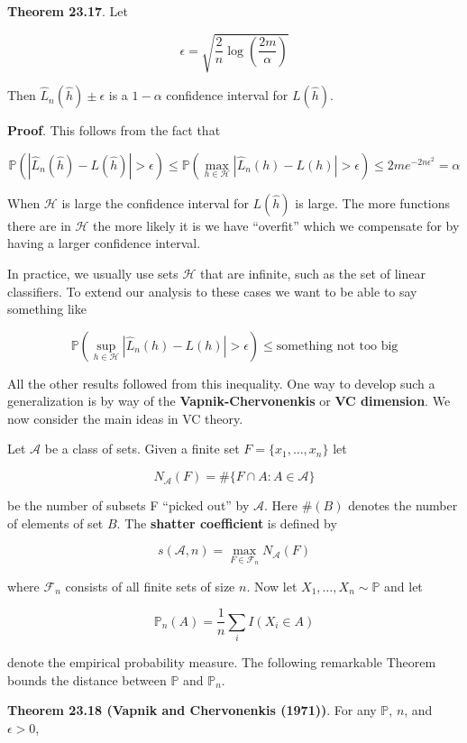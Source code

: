 \textbf{Theorem 23.17}. Let

\[ \epsilon = \sqrt{\frac{2}{n} \log \left( \frac{2m}{\alpha} \right) } \]

Then \(\hat{L}_{n}(\hat{h}) \pm \epsilon\) is a \(1 - \alpha\) confidence
interval for \(L(\hat{h})\).

\textbf{Proof}. This follows from the fact that

\[
\mathbb{P}(|\hat{L}_{n}(\hat{h}) - L(\hat{h})| > \epsilon) 
\leq \mathbb{P}( \max_{h \in \mathcal{H}} |\hat{L}_{n}(h) - L(h) | > \epsilon )
\leq 2 m e^{-2 n \epsilon^{2}} = \alpha
\]

When \(\mathcal{H}\) is large the confidence interval for \(L(\hat{h})\)
is large. The more functions there are in \(\mathcal{H}\) the more
likely it is we have ``overfit'' which we compensate for by having a
larger confidence interval.

In practice, we usually use sets \(\mathcal{H}\) that are infinite, such
as the set of linear classifiers. To extend our analysis to these cases
we want to be able to say something like

\[ \mathbb{P} \left( \sup_{h \in \mathcal{H}} |\hat{L}_{n}(h) - L(h) | > \epsilon \right) \leq \text{something not too big} \]

All the other results followed from this inequality. One way to develop
such a generalization is by way of the \textbf{Vapnik-Chervonenkis} or
\textbf{VC dimension}. We now consider the main ideas in VC theory.

Let \(\mathcal{A}\) be a class of sets. Given a finite set
\(F = \{ x_{1}, \dots, x_{n} \}\) let

\[ N_\mathcal{A}(F) = \# \Big\{ F \cap A : A \in \mathcal{A} \Big\} \]

be the number of subsets F ``picked out'' by \(\mathcal{A}\). Here
\(\#(B)\) denotes the number of elements of set \(B\). The
\textbf{shatter coefficient} is defined by

\[ s(\mathcal{A}, n) = \max_{F \in \mathcal{F}_{n}} N_\mathcal{A}(F) \]

where \(\mathcal{F}_{n}\) consists of all finite sets of size \(n\). Now
let \(X_{1}, \dots, X_{n} \sim \mathbb{P}\) and let

\[ \mathbb{P}_{n}(A) = \frac{1}{n} \sum_{i} I(X_{i} \in A) \]

denote the empirical probability measure. The following remarkable
Theorem bounds the distance between \(\mathbb{P}\) and \(\mathbb{P}_{n}\).

\textbf{Theorem 23.18 (Vapnik and Chervonenkis (1971))}. For any
\(\mathbb{P}\), \(n\), and \(\epsilon > 0\),

